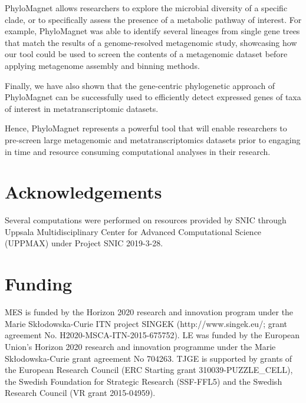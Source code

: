 \documentclass[a4paper]{article}
\begin{document}
PhyloMagnet allows researchers to explore the microbial diversity of a specific clade, or to specifically assess the presence of a metabolic pathway of interest. For example, PhyloMagnet was able to identify several lineages from single gene trees that match the results of a genome-resolved metagenomic study, showcasing how our tool could be used to screen the contents of a metagenomic dataset before applying metagenome assembly and binning methods.

Finally, we have also shown that the gene-centric phylogenetic approach of PhyloMagnet can be successfully used to efficiently detect expressed genes of taxa of interest in metatranscriptomic datasets. 

Hence, PhyloMagnet represents a powerful tool that will enable researchers to pre-screen large metagenomic and metatranscriptomics datasets prior to engaging in time and resource consuming computational analyses in their research.


\section*{Acknowledgements}
Several computations were performed on resources provided by SNIC through Uppsala Multidisciplinary Center for Advanced Computational Science (UPPMAX) under Project SNIC 2019-3-28.

\section*{Funding}
MES is funded by the Horizon 2020 research and innovation program under the Marie Sk\l{}odowska-Curie ITN project SINGEK (http://www.singek.eu/; grant agreement No. H2020-MSCA-ITN-2015-675752). LE was funded by the European Union’s Horizon 2020 research and innovation programme under the Marie Sk\l{}odowska-Curie grant agreement No 704263. TJGE is supported by grants of the European Research Council (ERC Starting grant 310039-PUZZLE\_CELL), the Swedish Foundation for Strategic Research (SSF-FFL5) and the Swedish Research Council (VR grant 2015-04959).

%



\newpage

\renewcommand\thefigure{S\arabic{figure}}
\setcounter{figure}{0}    

\begin{figure}[!t]
\caption{}\label{fig:S1}
\end{figure}

\begin{figure}[!t]
\caption{}\label{fig:S2}
\end{figure}

\renewcommand\thetable{S\arabic{table}}
\setcounter{table}{0}    

\begin{table}[!t]
\caption{}\label{tab:S1} 
\end{table}

\begin{table}[!t]
\caption{}\label{tab:S2} 
\end{table}
\end{document}
